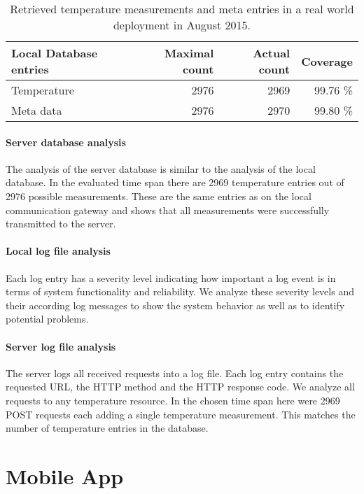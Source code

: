 \begin{table}
	\begin{center}
		\begin{tabular}{ l | r r r }
			Local Database entries & Maximal count & Actual count & Coverage \\
			\hline
			Temperature			& 2976 & 2969 & 99.76 \% \\
			Meta data			& 2976 & 2970 & 99.80 \% \\
		\end{tabular}
		\caption{Retrieved temperature measurements and meta entries in a real world deployment in August 2015.}
		\label{table:evaluation_local_database_coverage}
	\end{center}
\end{table}

\paragraph{Server database analysis}


The analysis of the server database is similar to the analysis of the local database.
In the evaluated time span there are 2969 temperature entries out of 2976 possible measurements.
These are the same entries as on the local communication gateway and shows that all measurements were successfully transmitted to the server.

\paragraph{Local log file analysis}

Each log entry has a severity level indicating how important a log event is in terms of system functionality and reliability.
We analyze these severity levels and their according log messages to show the system behavior as well as to identify potential problems.



\paragraph{Server log file analysis}

The server logs all received requests into a log file.
Each log entry contains the requested URL, the HTTP method and the HTTP response code.
We analyze all requests to any temperature resource.
In the chosen time span here were 2969 POST requests each adding a single temperature measurement.
This matches the number of temperature entries in the database.





\section{Mobile App}

